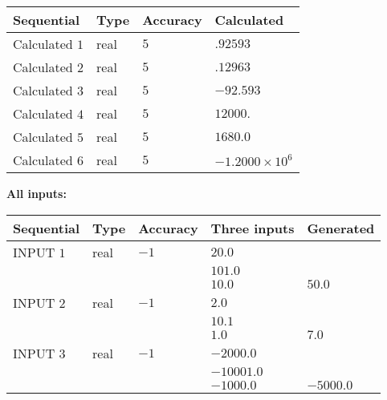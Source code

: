 \documentclass[12pt]{article}
\begin{document}
   
   
   
\noindent{}
   
   
  
  
\noindent\begin{tabular}{|l|l|l|l|}
\hline
 Sequential & Type & Accuracy & Calculated \\ 
\hline
 
 
  Calculated $           1$ & real & $           5 $ & 
 $ .92593 $ 
 \\  \hline  
 
 
  Calculated $           2$ & real & $           5 $ & 
 $ .12963 $ 
 \\  \hline  
 
 
  Calculated $           3$ & real & $           5 $ & 
 $ -92.593 $ 
 \\  \hline  
 
 
  Calculated $           4$ & real & $           5 $ & 
 $ 12000. $ 
 \\  \hline  
 
 
  Calculated $           5$ & real & $           5 $ & 
 $ 1680.0 $ 
 \\  \hline  
 
 
  Calculated $           6$ & real & $           5 $ & 
 $ -1.2000 \times 10^{6} $ 
 \\  \hline  
 \end{tabular}
   
   
   
   
\noindent\vspace{0.1in}\hspace{-0.08in} {\textbf{\Large{All inputs: }}}
   
   
  
  
\noindent\begin{tabular}{|l|l|l|l|l|}
\hline
 Sequential & Type & Accuracy & Three inputs & Generated \\ 
\hline
 
 
  INPUT $           1$ & real & $          -1 $ & $
 20.0
  $ & \\
  & & &  $
 101.0
  $ & \\
  & & &  $
 10.0
 $ & $ 50.0 $ 
 \\  \hline  
 
 
  INPUT $           2$ & real & $          -1 $ & $
 2.0
  $ & \\
  & & &  $
 10.1
  $ & \\
  & & &  $
 1.0
 $ & $ 7.0 $ 
 \\  \hline  
 
 
  INPUT $           3$ & real & $          -1 $ & $
 -2000.0
  $ & \\
  & & &  $
 -10001.0
  $ & \\
  & & &  $
 -1000.0
 $ & $ -5000.0 $ 
 \\  \hline  
 \end{tabular}
   
\end{document}
